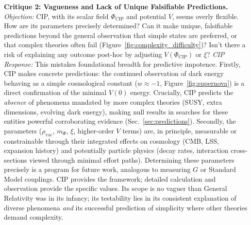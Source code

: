 \documentclass[11pt, a4paper]{article}
\newcommand{\subt}[1]{\mathrm{#1}}
\begin{document}
\textbf{Critique 2: Vagueness and Lack of Unique Falsifiable Predictions.}
\textit{Objection:} CIP, with its scalar field $\Phi_{\subt{CIP}}$ and potential $V$, seems overly flexible. How are its parameters precisely determined? Can it make unique, falsifiable predictions beyond the general observation that simple states are preferred, or that complex theories often fail (Figure~\ref{fig:complexity_difficulty})? Isn't there a risk of explaining any outcome post-hoc by adjusting $V(\Phi_{\subt{CIP}})$ or $\xi$?
\textit{CIP Response:} This mistakes foundational breadth for predictive impotence. Firstly, CIP makes concrete predictions: the continued observation of dark energy behaving as a simple cosmological constant ($w \approx -1$, Figure~\ref{fig:supernova}) is a direct confirmation of the minimal $V(0)$ energy. Crucially, CIP predicts the \textit{absence} of phenomena mandated by more complex theories (SUSY, extra dimensions, evolving dark energy), making null results in searches for these entities powerful corroborating evidence (Sec.~\ref{sec:predictions}). Secondly, the parameters ($\rho_{\subt{vac}}$, $m_{\Phi}$, $\xi$, higher-order $V$ terms) are, in principle, measurable or constrainable through their integrated effects on cosmology (CMB, LSS, expansion history) and potentially particle physics (decay rates, interaction cross-sections viewed through minimal effort paths). Determining these parameters precisely is a program for future work, analogous to measuring $G$ or Standard Model couplings. CIP provides the framework; detailed calculation and observation provide the specific values. Its scope is no vaguer than General Relativity was in its infancy; its testability lies in its consistent explanation of diverse phenomena \textit{and} its successful prediction of simplicity where other theories demand complexity.
\end{document}
